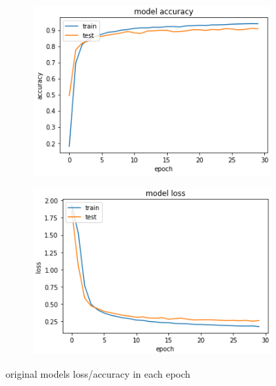 \begin{figure}
    \centering
    \begin{subfigure}[b]{0.2\textwidth}
        \includegraphics[width=\textwidth]{figures/Original/acc.png}
    \end{subfigure}
    \begin{subfigure}[b]{0.2\textwidth}
        \includegraphics[width=\textwidth]{figures/Original/loss.png}
    \end{subfigure}
    
    \caption{\centering
    original models loss/accuracy in each epoch
    }
    \label{fig:original}
\end{figure}





